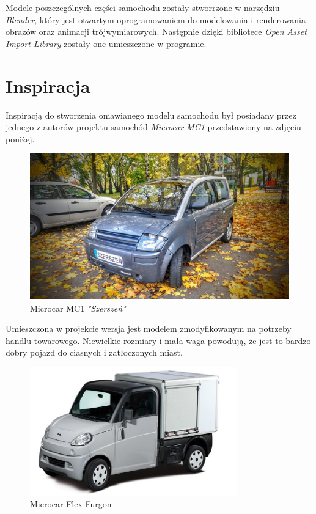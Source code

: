 \documentclass[a4paper,12pt]{article}
\numberwithin{equation}{section}
\begin{document}
Modele poszczególnych części samochodu zostały stworrzone w narzędziu \textit{Blender}, który jest otwartym oprogramowaniem do modelowania i renderowania obrazów oraz animacji trójwymiarowych. Następnie dzięki bibliotece \textit{Open Asset Import Library} zostały one umieszczone w programie.


\section{Inspiracja}
Inspiracją do stworzenia omawianego modelu samochodu był posiadany przez jednego z autorów projektu samochód \textit{Microcar MC1} przedstawiony na zdjęciu poniżej.
\begin{figure}[h!]
    \centering
    \includegraphics[width=\textwidth]{szerszen.jpg}
    \caption{Microcar MC1 \textit{"Szerszeń"}}
    \label{fig:szerszen}
    \vspace{1cm}
\end{figure}

Umieszczona w projekcie wersja jest modelem zmodyfikowanym na potrzeby handlu towarowego. Niewielkie rozmiary i mała waga powodują, że jest to bardzo dobry pojazd do ciasnych i zatłoczonych miast.
\begin{figure}[h!]
    \centering
    \includegraphics[width=0.8\textwidth]{furgon.jpg}
    \caption{Microcar Flex Furgon}
    \label{fig:furgon}
\end{figure}
\end{document}

